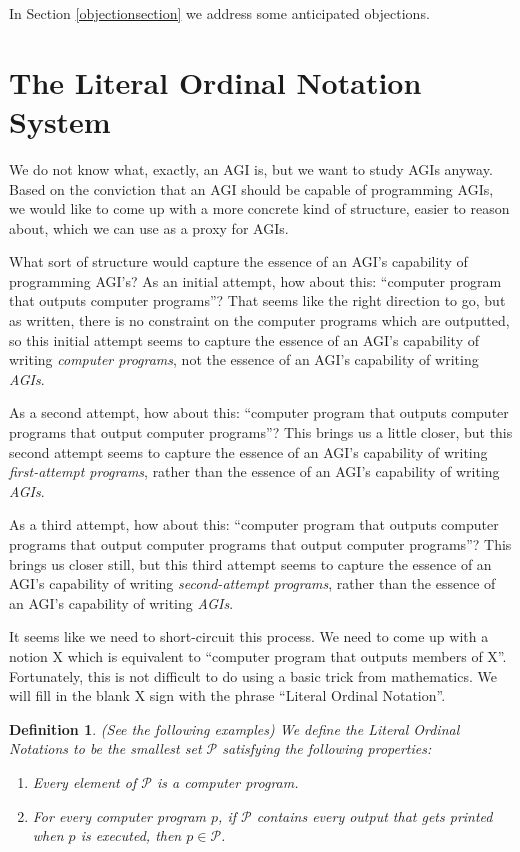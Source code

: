 \documentclass[runningheads]{llncs}
\newtheorem{mydefinition}[mytheorem]{Definition}
\begin{document}
In Section \ref{objectionsection} we address some anticipated objections.


\section{The Literal Ordinal Notation System}
\label{notationsystemsection}

We do not know what, exactly, an AGI is, but we want to study AGIs anyway.
Based on the conviction that an AGI should be capable of programming AGIs,
we would like to come up with a more concrete kind of structure, easier to reason
about, which we can use as a proxy for AGIs.

What sort of structure would capture the essence of an AGI's capability
of programming AGI's? As an initial attempt, how about this: ``computer
program that outputs computer programs''? That seems like the right direction
to go, but as written, there is no constraint on the computer programs which
are outputted, so this initial attempt seems to capture the essence of an
AGI's capability of writing \emph{computer programs}, not the essence of an
AGI's capability of writing \emph{AGIs}.

As a second attempt, how
about this: ``computer program that outputs computer programs that output
computer programs''? This brings us a little closer, but this second attempt
seems to capture the essence of an AGI's capability of writing \emph{first-attempt programs},
rather than the essence of an AGI's capability of writing \emph{AGIs}.

As a third attempt, how about this:
``computer program that outputs computer programs that output computer programs
that output computer programs''? This brings us closer still, but this third
attempt seems to capture the essence of an AGI's capability of writing
\emph{second-attempt programs}, rather than the essence of an AGI's capability of
writing \emph{AGIs}.

It seems like we need to short-circuit this process. We need to come up with a notion
X which is equivalent to ``computer program that outputs members of X''.
Fortunately, this is not difficult to do using a basic trick from mathematics.
We will fill in the blank X sign with the phrase ``Literal Ordinal Notation''.

\begin{mydefinition}
\label{literalnotationdef}
    (See the following examples)
    We define the Literal Ordinal Notations to be the smallest set $\mathcal P$
    satisfying the following properties:
    \begin{enumerate}
        \item
            Every element of $\mathcal P$ is a computer program.
        \item
            For every computer program $p$,
            if $\mathcal P$ contains every output that gets printed when $p$ is executed,
            then $p\in\mathcal P$.
    \end{enumerate}
\end{mydefinition}
\end{document}
